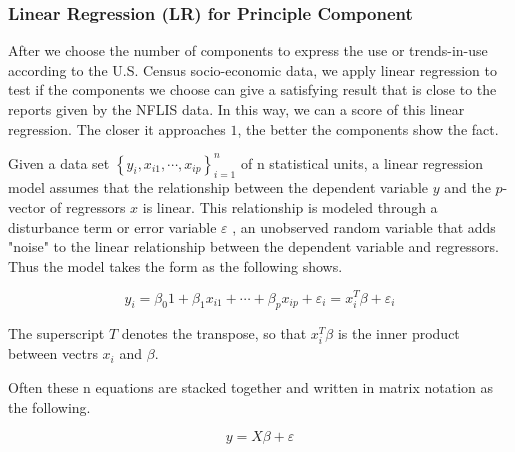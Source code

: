 \documentclass{mcmthesis}
\begin{document}
\subsubsection{Linear Regression (LR) for Principle Component}
After we choose the number of components to express the use or trends-in-use according to the U.S. Census socio-economic data, we apply linear regression to test if the components we choose can give a satisfying result that is close to the reports given by the NFLIS data. In this way, we can a score of this linear regression. The closer it approaches $1$, the better the components show the fact.

Given a data set $\left \{ y_{i}, x_{i1}, \cdots , x_{ip} \right \}_{i = 1}^{n}$ of n statistical units, a linear regression model assumes that the relationship between the dependent variable $y$ and the $p$-vector of regressors $x$ is linear. This relationship is modeled through a disturbance term or error variable $ε$ , an unobserved random variable that adds "noise" to the linear relationship between the dependent variable and regressors. Thus the model takes the form  as the following shows.

\begin{equation}
    y_i = \beta_{0}1+ \beta_{1}x_{i1}+\cdots +\beta_{p}x_{ip} + \varepsilon _{i} = x_{i}^{T}\beta + \varepsilon_{i}
\end{equation}

The superscript $T$ denotes the transpose, so that $x_{i}^{T}\beta$ is the inner product between vectrs $x_{i}$ and $\beta$. 

Often these n equations are stacked together and written in matrix notation as the following.

\begin{equation}
    y = X\beta + \varepsilon
\end{equation}
\end{document}
